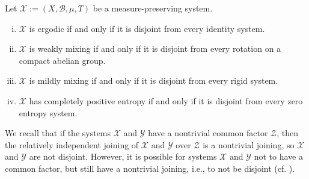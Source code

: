 \documentclass[graybox]{svmult}
\theoremstyle{definition}
\begin{document}
\begin{theorem}\label{thm:ClassicalDichotomies}
    Let $\mathcal{X} := (X,\mathscr{B},\mu,T)$ be a measure-preserving system.
    \begin{enumerate}[(i)]
        \item $\mathcal{X}$ is ergodic if and only if it is disjoint from every identity system.

        \item $\mathcal{X}$ is weakly mixing if and only if it is disjoint from every rotation on a compact abelian group.

        \item $\mathcal{X}$ is mildly mixing if and only if it is disjoint from every rigid system.

        \item $\mathcal{X}$ has completely positive entropy if and only if it is disjoint from every zero entropy system.
    \end{enumerate}
\end{theorem}

We recall that if the systems $\mathcal{X}$ and $\mathcal{Y}$ have a nontrivial common factor $\mathcal{Z}$, then the relatively independent joining of $\mathcal{X}$ and $\mathcal{Y}$ over $\mathcal{Z}$ is a nontrivial joining, so $\mathcal{X}$ and $\mathcal{Y}$ are not disjoint.
However, it is possible for systems $\mathcal{X}$ and $\mathcal{Y}$ not to have a common factor, but still have a nontrivial joining, i.e., to not be disjoint (cf. \cite[Example 7.15]{ErgodicTheoryViaJoinings}).
\end{document}
